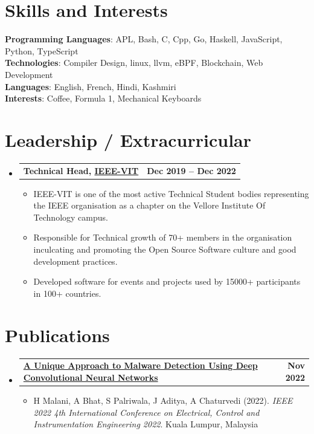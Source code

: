 \documentclass[a4paper,11pt]{article}
\makeatletter
\newcommand{\resumeItem}[1]{
  \item\small{
    {#1 \vspace{-2pt}}
  }
}
\newcommand{\resumeSubheadingg}[2]{
  \vspace{-2pt}\item
    \begin{tabular*}{1.0\textwidth}[t]{l@{\extracolsep{\fill}}r}
      \textbf{#1} & \textbf{\small #2} \\
    \end{tabular*}\vspace{-7pt}
}
\newcommand{\resumeSubHeadingListStart}{\begin{itemize}[leftmargin=0.0in, label={}]}
\newcommand{\resumeSubHeadingListEnd}{\end{itemize}}
\newcommand{\resumeItemListStart}{\begin{itemize}}
\newcommand{\resumeItemListEnd}{\end{itemize}\vspace{-5pt}}
\makeatother
\begin{document}
%
\section{Skills and Interests}
 \begin{itemize}[leftmargin=0.15in, label={}]
    \small{\item{
     \textbf{Programming Languages}{: APL, Bash, C, Cpp, Go, Haskell, JavaScript, Python, TypeScript} \\
     \textbf{Technologies}{: Compiler Design, linux, llvm, eBPF, Blockchain, Web Development} \\
     \textbf{Languages}{: English, French, Hindi, Kashmiri} \\
     \textbf{Interests}{: Coffee, Formula 1, Mechanical Keyboards} \\
    }}
 \end{itemize}
 \vspace{-16pt}

\section{Leadership / Extracurricular}
    \resumeSubHeadingListStart
        \resumeSubheadingg{{Technical Head, \href{https://ieeevit.org}{IEEE-VIT}}}{Dec 2019 -- Dec 2022}
            \resumeItemListStart
                \resumeItem{IEEE-VIT is one of the most active Technical Student bodies representing the IEEE organisation as a chapter on the Vellore Institute Of Technology campus.}
                \resumeItem{Responsible for Technical growth of 70+ members in the organisation inculcating and promoting the Open Source Software culture and good development practices.}
                \resumeItem{Developed software for events and projects used by 15000+ participants in 100+ countries.}
            \resumeItemListEnd
    \resumeSubHeadingListEnd
    
\section{Publications}
  \resumeSubHeadingListStart
    \resumeSubheadingg
      {\href{https://ieeexplore.ieee.org/document/10000344}{A Unique Approach to Malware Detection Using Deep Convolutional Neural Networks}}{Nov 2022}
      \resumeItemListStart
        \resumeItem{H Malani, A Bhat, S Palriwala, J Aditya, A Chaturvedi (2022). \textit{IEEE 2022 4th International Conference on Electrical, Control and Instrumentation Engineering 2022}. Kuala Lumpur, Malaysia}
    \resumeItemListEnd
  \resumeSubHeadingListEnd
\end{document}
